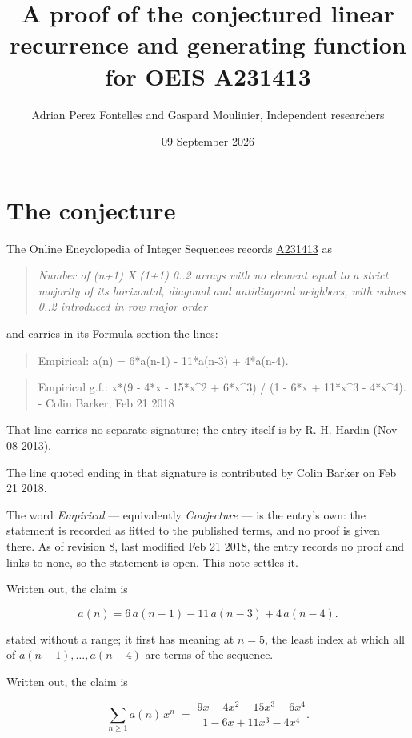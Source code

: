 \documentclass[11pt]{article}
\title{A proof of the conjectured linear recurrence and generating function for OEIS A231413}
\author{Adrian Perez Fontelles and Gaspard Moulinier, Independent researchers}
\date{09 September 2026}
\theoremstyle{definition}
\begin{document}
\maketitle
\section{The conjecture}

The Online Encyclopedia of Integer Sequences records \href{https://oeis.org/A231413}{A231413} as

\begin{quote}\itshape Number of (n+1) X (1+1) 0..2 arrays with no element equal to a strict majority of its horizontal, diagonal and antidiagonal neighbors, with values 0..2 introduced in row major order\end{quote}

and carries in its Formula section the lines:

\begin{quote}\ttfamily Empirical: a(n) = 6*a(n-1) - 11*a(n-3) + 4*a(n-4).\end{quote}

\begin{quote}\ttfamily Empirical g.f.: x*(9 - 4*x - 15*x\textasciicircum{}2 + 6*x\textasciicircum{}3) / (1 - 6*x + 11*x\textasciicircum{}3 - 4*x\textasciicircum{}4). - Colin Barker, Feb 21 2018\end{quote}

That line carries no separate signature; the entry itself is by R. H. Hardin (Nov 08 2013).

The line quoted ending in that signature is contributed by Colin Barker on Feb 21 2018.

The word {\itshape Empirical} --- equivalently {\itshape Conjecture} --- is the entry's own: the statement is recorded as fitted to the published terms, and no proof is given there. As of revision 8, last modified Feb 21 2018, the entry records no proof and links to none, so the statement is open. This note settles it.

Written out, the claim is

\[a(n) = 6\,a(n-1) - 11\,a(n-3) + 4\,a(n-4).\]

stated without a range; it first has meaning at $n = 5$, the least index at which all of $a(n-1),\dots,a(n-4)$ are terms of the sequence.

Written out, the claim is

\[\sum_{n \ge 1} a(n)\,x^n \;=\; \frac{9x - 4x^{2} - 15x^{3} + 6x^{4}}{1 - 6x + 11x^{3} - 4x^{4}}.\]
\end{document}
